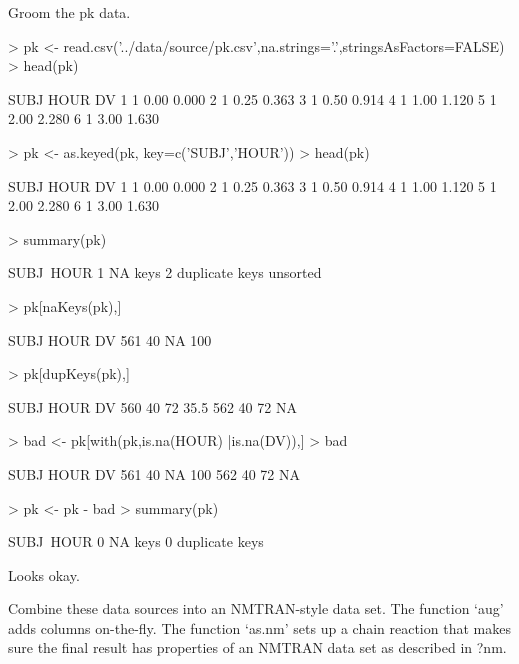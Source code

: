Groom the pk data.
\begin{Schunk}
\begin{Sinput}
> pk   <- read.csv('../data/source/pk.csv',na.strings='.',stringsAsFactors=FALSE)
> head(pk)
\end{Sinput}
\begin{Soutput}
  SUBJ HOUR    DV
1    1 0.00 0.000
2    1 0.25 0.363
3    1 0.50 0.914
4    1 1.00 1.120
5    1 2.00 2.280
6    1 3.00 1.630
\end{Soutput}
\begin{Sinput}
> pk <- as.keyed(pk, key=c('SUBJ','HOUR'))
> head(pk)
\end{Sinput}
\begin{Soutput}
  SUBJ HOUR    DV
1    1 0.00 0.000
2    1 0.25 0.363
3    1 0.50 0.914
4    1 1.00 1.120
5    1 2.00 2.280
6    1 3.00 1.630
\end{Soutput}
\begin{Sinput}
> summary(pk)
\end{Sinput}
\begin{Soutput}
SUBJ~HOUR
1 NA keys
2 duplicate keys
unsorted
\end{Soutput}
\begin{Sinput}
> pk[naKeys(pk),]
\end{Sinput}
\begin{Soutput}
    SUBJ HOUR  DV
561   40   NA 100
\end{Soutput}
\begin{Sinput}
> pk[dupKeys(pk),]
\end{Sinput}
\begin{Soutput}
    SUBJ HOUR   DV
560   40   72 35.5
562   40   72   NA
\end{Soutput}
\begin{Sinput}
> bad <- pk[with(pk,is.na(HOUR) |is.na(DV)),]
> bad
\end{Sinput}
\begin{Soutput}
    SUBJ HOUR  DV
561   40   NA 100
562   40   72  NA
\end{Soutput}
\begin{Sinput}
> pk <- pk - bad
> summary(pk)
\end{Sinput}
\begin{Soutput}
SUBJ~HOUR
0 NA keys
0 duplicate keys
\end{Soutput}
\end{Schunk}
Looks okay.  

Combine these data sources into an NMTRAN-style data set.
The function `aug' adds columns on-the-fly.
The function `as.nm' sets up a chain reaction that makes sure the
final result has properties of an NMTRAN data set as described in ?nm.

